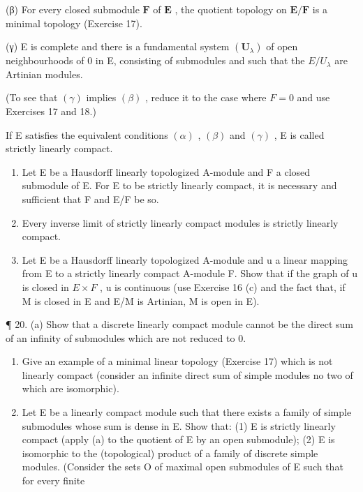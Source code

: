 (β) For every closed submodule \(\mathbf{F}\) of \(\mathbf{E}\) , the quotient topology on \(\mathbf{E} / \mathbf{F}\) is a minimal topology (Exercise 17).

(γ) E is complete and there is a fundamental system \((\mathbf{U}_{\lambda})\) of open neighbourhoods of 0 in E, consisting of submodules and such that the \(E/U_{\lambda}\) are Artinian modules.

(To see that \((\gamma)\) implies \((\beta)\) , reduce it to the case where \(F = 0\) and use Exercises 17 and 18.)

If E satisfies the equivalent conditions \((\alpha)\) , \((\beta)\) and \((\gamma)\) , E is called strictly linearly compact.

\begin{enumerate}
\def\labelenumi{(\alph{enumi})}
\setcounter{enumi}{1}
\item
  Let E be a Hausdorff linearly topologized A-module and F a closed submodule of E. For E to be strictly linearly compact, it is necessary and sufficient that F and E/F be so.
\item
  Every inverse limit of strictly linearly compact modules is strictly linearly compact.
\item
  Let E be a Hausdorff linearly topologized A-module and u a linear mapping from E to a strictly linearly compact A-module F. Show that if the graph of u is closed in \(E \times F\) , u is continuous (use Exercise 16 (c) and the fact that, if M is closed in E and E/M is Artinian, M is open in E).
\end{enumerate}

¶ 20. (a) Show that a discrete linearly compact module cannot be the direct sum of an infinity of submodules which are not reduced to 0.

\begin{enumerate}
\def\labelenumi{(\alph{enumi})}
\setcounter{enumi}{1}
\item
  Give an example of a minimal linear topology (Exercise 17) which is not linearly compact (consider an infinite direct sum of simple modules no two of which are isomorphic).
\item
  Let E be a linearly compact module such that there exists a family of simple submodules whose sum is dense in E. Show that: (1) E is strictly linearly compact (apply (a) to the quotient of E by an open submodule); (2) E is isomorphic to the (topological) product of a family of discrete simple modules. (Consider the sets O of maximal open submodules of E such that for every finite
\end{enumerate}

